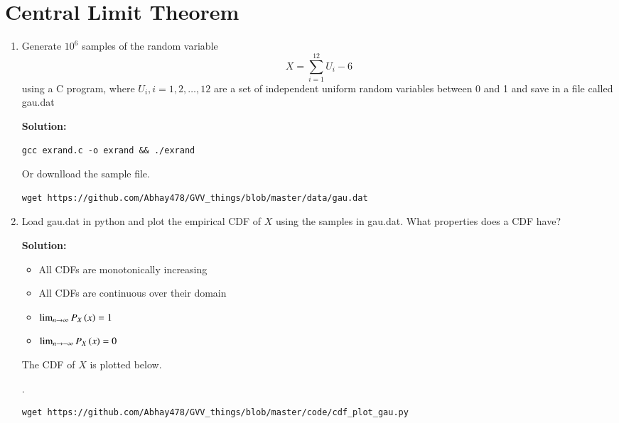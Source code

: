 \documentclass[journal,12pt,twocolumn]{IEEEtran}
\renewcommand\thesection{\arabic{section}}
\theoremstyle{remark}
\newcommand{\solution}{\noindent \textbf{Solution: }}
\numberwithin{equation}{section}
\numberwithin{equation}{section}
\begin{document}
\section{Central Limit Theorem}
%
\begin{enumerate}[label=\thesection.\arabic*,ref=\thesection.\theenumi]

%
\item
Generate $10^6$ samples of the random variable
%
\begin{equation}
X = \sum_{i=1}^{12}U_i -6
\end{equation}
%
using a C program, where $U_i, i = 1,2,\dots, 12$ are  a set of independent uniform random variables 
between 0 and 1 and save in a file called gau.dat

\solution

        
    \begin{lstlisting}
gcc exrand.c -o exrand && ./exrand
    \end{lstlisting}

    Or downlload the sample file.
    \begin{lstlisting}
wget https://github.com/Abhay478/GVV_things/blob/master/data/gau.dat
    \end{lstlisting}

\item
Load gau.dat in python and plot the empirical CDF of $X$ using the samples in gau.dat. 
What properties does a CDF have?

\solution 

\begin{itemize}
    \item All CDFs are monotonically increasing
    \item All CDFs are continuous over their domain
    \item $\lim_{n \rightarrow \infty} \cdf{x}{X} = 1$
    \item $\lim_{n \rightarrow -\infty} \cdf{x}{X} = 0$
\end{itemize}

The CDF of $X$ is plotted below.

.
\begin{lstlisting}
wget https://github.com/Abhay478/GVV_things/blob/master/code/cdf_plot_gau.py
\end{lstlisting}


\end{enumerate}
\end{document}
